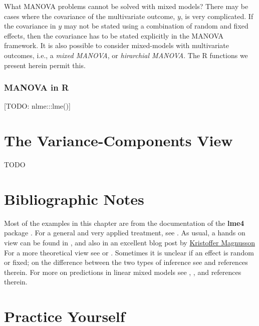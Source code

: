 \documentclass[]{book}
\theoremstyle{definition}
\theoremstyle{definition}
\theoremstyle{definition}
\theoremstyle{remark}
\begin{document}
What MANOVA problems cannot be solved with mixed models? There may be
cases where the covariance of the multivariate outcome, \(y\), is very
complicated. If the covariance in \(y\) may not be stated using a
combination of random and fixed effects, then the covariance has to be
stated explicitly in the MANOVA framework. It is also possible to
consider mixed-models with multivariate outcomes, i.e., a \emph{mixed
MANOVA}, or \emph{hirarchial MANOVA}. The R functions we present herein
permit this.

\subsubsection{MANOVA in R}\label{manova-in-r}

{[}TODO: nlme:::lme(){]}

\section{The Variance-Components
View}\label{the-variance-components-view}

TODO

\section{Bibliographic Notes}\label{bibliographic-notes-5}

Most of the examples in this chapter are from the documentation of the
\textbf{lme4} package \citep{lme4}. For a general and very applied
treatment, see \citet{pinero2000mixed}. As usual, a hands on view can be
found in \citet{venables2013modern}, and also in an excellent blog post
by
\href{http://rpsychologist.com/r-guide-longitudinal-lme-lmer}{Kristoffer
Magnusson} For a more theoretical view see \citet{weiss2005modeling} or
\citet{searle2009variance}. Sometimes it is unclear if an effect is
random or fixed; on the difference between the two types of inference
see \citet{rosset2018fixed} and references therein. For more on
predictions in linear mixed models see \citet{robinson1991blup},
\citet{rabinowicz2018assessing}, and references therein.

\section{Practice Yourself}\label{practice-yourself-4}
\end{document}
